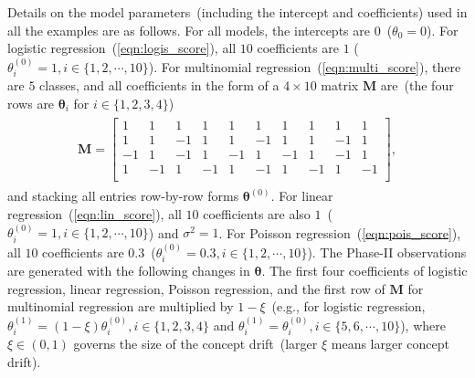 \documentclass[twoside,11pt]{article}
\begin{document}
\begin{appendices}
Details on the model parameters~(including the intercept and coefficients) used in all the examples are as follows. For all models, the intercepts are $0$~($\theta_0=0$). For logistic regression~(\ref{eqn:logis_score}), all $10$ coefficients are $1$ ($\theta_i^{(0)}=1, i\in\{1,2,\cdots,10\}$). For multinomial regression~(\ref{eqn:multi_score}), there are $5$ classes, and all coefficients in the form of a $4\times 10$ matrix $\mathbf{M}$ are~(the four rows are $\bm{\theta}_i$ for $i\in\{1,2,3,4\}$)
\begin{align}
\begin{aligned}
\mathbf{M} = 
\begin{bmatrix}
1 & 1 & 1 & 1 & 1 & 1 & 1 & 1 & 1 & 1\\
1 & 1 & -1 & 1 & 1 & -1 & 1 & 1 & -1 & 1\\
-1 & 1 & -1 & 1 & -1 & 1 & -1 & 1 & -1 & 1\\
1 & -1 & 1 & -1 & 1 & -1 & 1 & -1 & 1 & -1\\
\end{bmatrix},
\end{aligned}
\end{align}
and stacking all entries row-by-row forms $\bm{\theta}^{(0)}$.
For linear regression~(\ref{eqn:lin_score}), all $10$ coefficients are also $1$~($\theta_i^{(0)}=1, i\in\{1,2,\cdots,10\}$) and $\sigma^2=1$. For Poisson regression~(\ref{eqn:pois_score}), all $10$ coefficients are $0.3$~($\theta_i^{(0)}=0.3, i\in\{1,2,\cdots,10\}$). The Phase-II observations are generated with the following changes in $\bm{\theta}$. The first four coefficients of logistic regression, linear regression, Poisson regression, and the first row of $\mathbf{M}$ for multinomial regression are multiplied by $1-\xi$~(e.g., for logistic regression, $\theta_i^{(1)}=(1-\xi)\theta_i^{(0)}, i\in\{1,2,3,4\}$ and $\theta_i^{(1)}=\theta_i^{(0)}, i\in\{5,6,\cdots,10\}$), where $\xi\in(0,1)$ governs the size of the concept drift~(larger $\xi$ means larger concept drift).


\end{appendices}
\end{document}
